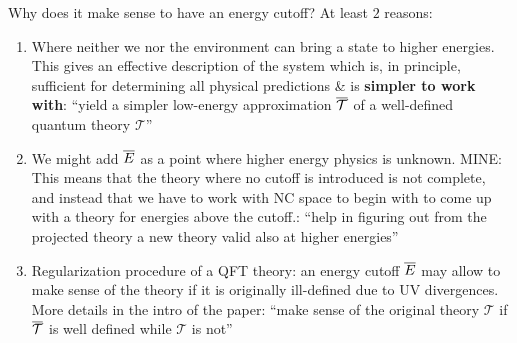 { \color{gray}
    
    
    Why does it make sense to have an energy cutoff? At least $2$ reasons:
        
            \begin{enumerate}
                
            \item Where neither we nor the environment can bring a state to higher energies. This gives an effective description of the system which is, in principle, sufficient for determining all physical predictions \& is \textbf{simpler to work with}: \cite{FioreTheCase2020} ``yield a simpler low-energy approximation $\overline{\mathcal T}$ of a well-defined quantum theory $\mathcal T$''
            
            \item We might add $\overline{E}$ as a point where higher energy physics is unknown. MINE: This means that the theory where no cutoff is introduced is not complete, and instead that we have to work with NC space to begin with to come up with a theory for energies above the cutoff.: \cite{FioreTheCase2020}``help in figuring out from the projected theory a new theory valid also at higher energies''
            
            \item \cite{FioreTheCase2020} Regularization procedure of a QFT theory: an energy cutoff $\overline{E}$ may allow to make sense of the theory if it is originally ill-defined due to UV divergences. More details in the intro of the paper: \cite{2020}``make sense of the original theory $\mathcal T$ if $\overline{\mathcal T}$ is well defined while $\mathcal T$ is not''
                
            \end{enumerate}
            
            
}

